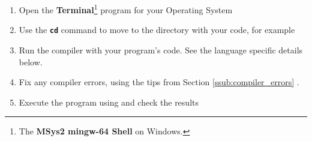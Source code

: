 \begin{enumerate}
  \item Open the \textbf{Terminal}\footnote{The \textbf{MSys2 mingw-64 Shell} on Windows.} program for your Operating System
  \item Use the \texttt{\textbf{cd}} command to move to the directory with your code, for example \newline {}
  \item Run the compiler with your program's code. See the language specific details below.
  \item Fix any compiler errors, using the tips from Section \ref{ssub:compiler_errors} .
  \item Execute the program using  and check the results
\end{enumerate}







